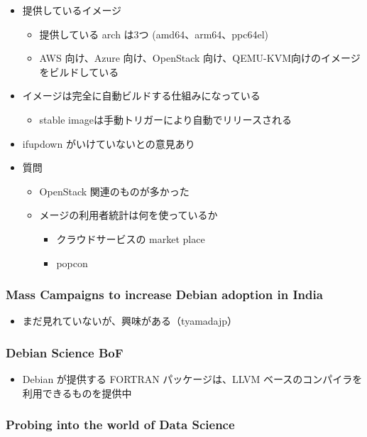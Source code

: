 \documentclass[mingoth,a4paper]{jsarticle}
\begin{document}
\begin{itemize}
\item 提供しているイメージ
  \begin{itemize}
  \item 提供している arch は3つ (amd64、arm64、ppc64el)
  \item AWS 向け、Azure 向け、OpenStack 向け、QEMU-KVM向けのイメージをビルドしている
  \end{itemize}
\item イメージは完全に自動ビルドする仕組みになっている
  \begin{itemize}
  \item stable imageは手動トリガーにより自動でリリースされる
  \end{itemize}
\item ifupdown がいけていないとの意見あり
\item 質問
  \begin{itemize}
  \item OpenStack 関連のものが多かった
  \item メージの利用者統計は何を使っているか
    \begin{itemize}
    \item クラウドサービスの market place
      \item popcon
    \end{itemize}
  \end{itemize}
\end{itemize}

\subsubsection{Mass Campaigns to increase Debian adoption in India}

\begin{itemize}
\item まだ見れていないが、興味がある（tyamadajp）
\end{itemize}

\subsubsection{Debian Science BoF}

\begin{itemize}
\item Debian が提供する FORTRAN パッケージは、LLVM ベースのコンパイラを利用できるものを提供中
\end{itemize}

\subsubsection{Probing into the world of Data Science}
\end{document}
